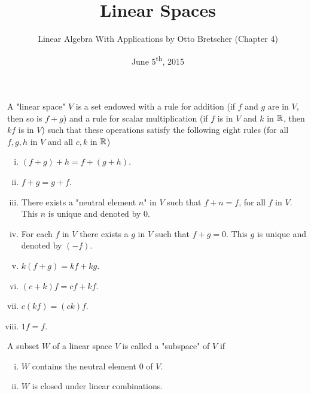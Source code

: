 \documentclass[a4paper,11pt]{article}
\title{Linear Spaces}
\author{Linear Algebra With Applications by Otto Bretscher (Chapter 4)}
\date{June 5\textsuperscript{th}, 2015}
\begin{document}
\maketitle
{}

\begin{outline}


    A "linear space" \(V\) is a set endowed with a rule for addition (if \(f\) and \(g\) are in \(V\), then so is 
    \(f + g\)) and a rule for scalar multiplication (if \(f\) is in \(V\) and \(k\) in \(\mathbb{R}\), then \(kf\) is in 
    \(V\)) such that these operations satisfy the following eight rules (for all \(f, g, h\) in \(V\) and all 
    \(c, k\) in \(\mathbb{R}\))
    \begin{enumerate}[i.]
      \item \((f + g) + h = f+ (g + h)\).
      \item \(f + g = g + f\).
      \item There exists a "neutral element \(n\)" in \(V\) such that \(f + n = f\), for all 
            \(f\) in \(V\). This \(n\) is unique and denoted by \(0\).
      \item For each \(f\) in \(V\) there exists a \(g\) in \(V\) such that \(f + g = 0\). This 
            \(g\) is unique and denoted by \((-f)\).
      \item \(k(f + g) = kf + kg\).
      \item \((c + k)f = cf + kf\).
      \item \(c(kf) = (ck)f\).
      \item \(1f = f\).
    \end{enumerate}
    
    A subset \(W\) of a linear space \(V\) is called a "subspace" of \(V\) if
    \begin{enumerate}[i.]
      \item \(W\) contains the neutral element \(0\) of \(V\).
      \item \(W\) is closed under linear combinations.
    \end{enumerate}
    

\end{outline}
\end{document}
